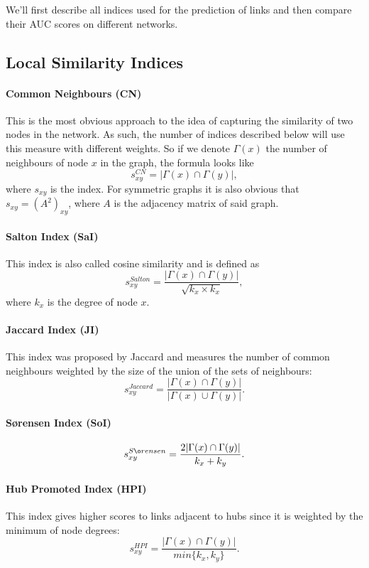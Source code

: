 \documentclass{llncs}
\begin{document}
We'll first describe all indices used for the prediction of links and then compare their AUC scores on different networks.
%
\subsection{Local Similarity Indices}
%
\paragraph{Common Neighbours (CN)}
%
This is the most obvious approach to the idea of capturing the similarity of two nodes in the network. As such, the number of indices described below will use this measure with different weights. So if we denote $\Gamma(x)$ the number of neighbours of node $x$ in the graph, the formula looks like
\begin{equation}
s_{xy}^{CN} = |\Gamma(x) \cap \Gamma(y)|,
\end{equation}
where $s_{xy}$ is the index. For symmetric graphs it is also obvious that $s_{xy} = (A^2)_{xy}$, where $A$ is the adjacency matrix of said graph.
%
\paragraph{Salton Index (SaI) \cite{salton-index}}
%
This index is also called cosine similarity and is defined as
\begin{equation}
s_{xy}^{Salton} = \frac{|\Gamma(x) \cap \Gamma(y)|}{\sqrt{k_x \times k_x}},
\end{equation}
where $k_x$ is the degree of node $x$.
%
\paragraph{Jaccard Index (JI) \cite{jaccard-index}}
%
This index was proposed by Jaccard and measures the number of common neighbours weighted by the size of the union of the sets of neighbours:
\begin{equation}
s_{xy}^{Jaccard} = \frac{|\Gamma(x) \cap \Gamma(y)|}{|\Gamma(x) \cup \Gamma(y)|}.
\end{equation}
%
\paragraph{S{\o}rensen Index (SoI) \cite{sorensen-index}}
%
\begin{equation}
s_{xy}^{S{\o}rensen} = \frac{2|\Gamma(x) \cap \Gamma(y)|}{k_x + k_y}.
\end{equation}
%
\paragraph{Hub Promoted Index (HPI) \cite{hub-index}}
%
This index gives higher scores to links adjacent to hubs since it is weighted by the minimum of node degrees:
\begin{equation}
s_{xy}^{HPI} = \frac{|\Gamma(x) \cap \Gamma(y)|}{min\{k_x, k_y\}}.
\end{equation}
%
\end{document}
